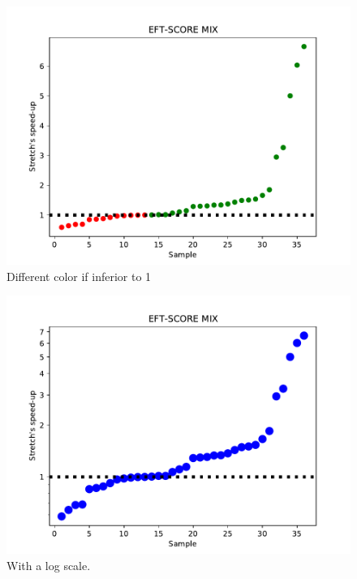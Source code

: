 \documentclass[conference,10pt]{IEEEtran}
\begin{document}
\begin{figure}\centering\includegraphics[width=1\linewidth]{../MBSS/plot/Scatter/scatter_mean_stretch_all_workloads_EFT-SCORE-MIX_v1.pdf}\caption{Different color if inferior to 1}\end{figure}
\begin{figure}\centering\includegraphics[width=1\linewidth]{../MBSS/plot/Scatter/scatter_mean_stretch_all_workloads_EFT-SCORE-MIX_v3.pdf}\caption{With a log scale.}\end{figure}
\end{document}
